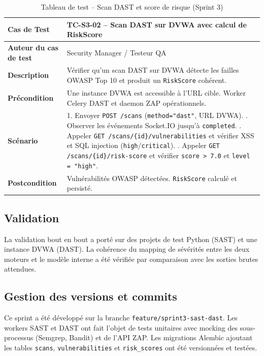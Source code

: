 \begin{table}[H]
\centering
\caption{Tableau de test -- Scan DAST et score de risque (Sprint 3)}
\label{tab:test-sprint3-dast}
\small
\renewcommand{\arraystretch}{1.3}
\begin{tabularx}{\textwidth}{>{\bfseries}p{3.5cm} X}
\hline
Cas de Test & TC-S3-02 -- Scan DAST sur DVWA avec calcul de RiskScore \\
\hline
Auteur du cas de test & Security Manager / Testeur QA \\
\hline
Description & Vérifier qu'un scan DAST sur DVWA détecte les failles OWASP Top 10 et produit un \texttt{RiskScore} cohérent. \\
\hline
Précondition & Une instance DVWA est accessible à l'URL cible. Worker Celery DAST et daemon ZAP opérationnels. \\
\hline
Scénario &
1. Envoyer \texttt{POST /scans} (\texttt{method="dast"}, URL DVWA). \newline
2. Observer les événements Socket.IO jusqu'à \texttt{completed}. \newline
3. Appeler \texttt{GET /scans/\{id\}/vulnerabilities} et vérifier XSS et SQL injection (\texttt{high}/\texttt{critical}). \newline
4. Appeler \texttt{GET /scans/\{id\}/risk-score} et vérifier \texttt{score > 7.0} et \texttt{level = "high"}. \\
\hline
Postcondition & Vulnérabilités OWASP détectées. \texttt{RiskScore} calculé et persisté. \\
\hline
\end{tabularx}
\end{table}

\subsection{Validation}
La validation bout en bout a porté sur des projets de test Python (SAST) et une instance DVWA (DAST). La cohérence du mapping de sévérités entre les deux moteurs et le modèle interne a été vérifiée par comparaison avec les sorties brutes attendues.

\subsection{Gestion des versions et commits}
Ce sprint a été développé sur la branche \texttt{feature/sprint3-sast-dast}. Les workers SAST et DAST ont fait l'objet de tests unitaires avec mocking des sous-processus (Semgrep, Bandit) et de l'API ZAP. Les migrations Alembic ajoutant les tables \texttt{scans}, \texttt{vulnerabilities} et \texttt{risk\_scores} ont été versionnées et testées.

